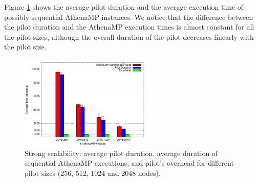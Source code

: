 
Figure \ref{fig:strongScala}  shows the average pilot duration and the average
execution time of possibly sequential AthenaMP instances.  We  notice that the
difference between the pilot duration and the AthenaMP execution times is almost
constant for all the pilot sizes, although the overall duration of the pilot
decreases linearly with the pilot size.

\begin{figure}[!htb]
        \includegraphics[height=4.5cm,width=\columnwidth]{./figures/NGE/strong.pdf}
    \caption{Strong scalability:  average pilot duration, average duration of
    sequential AthenaMP executions, and pilot's overhead for different pilot
    sizes (256, 512, 1024 and 2048 nodes).}
\label{fig:strongScala}
\end{figure}

%

%
%

